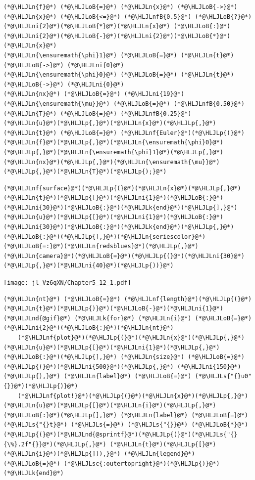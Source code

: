 \documentclass[12pt,a4paper]{article}
\newcommand{\HLJLk}[1]{\textcolor[RGB]{148,91,176}{\textbf{#1}}}
\newcommand{\HLJLn}[1]{#1}
\newcommand{\HLJLnd}[1]{\textcolor[RGB]{214,102,97}{#1}}
\newcommand{\HLJLnf}[1]{\textcolor[RGB]{66,102,213}{#1}}
\newcommand{\HLJLs}[1]{\textcolor[RGB]{201,61,57}{#1}}
\newcommand{\HLJLsc}[1]{\textcolor[RGB]{201,61,57}{#1}}
\newcommand{\HLJLnfB}[1]{\textcolor[RGB]{59,151,46}{#1}}
\newcommand{\HLJLni}[1]{\textcolor[RGB]{59,151,46}{#1}}
\newcommand{\HLJLoB}[1]{\textcolor[RGB]{102,102,102}{\textbf{#1}}}
\newcommand{\HLJLp}[1]{#1}
\begin{document}
\begin{lstlisting}
(*@\HLJLn{f}@*) (*@\HLJLoB{=}@*) (*@\HLJLn{x}@*) (*@\HLJLoB{->}@*) (*@\HLJLn{x}@*) (*@\HLJLoB{<=}@*) (*@\HLJLnfB{0.5}@*) (*@\HLJLoB{?}@*) (*@\HLJLni{2}@*)(*@\HLJLoB{*}@*)(*@\HLJLn{x}@*) (*@\HLJLoB{:}@*) (*@\HLJLni{2}@*)(*@\HLJLoB{-}@*)(*@\HLJLni{2}@*)(*@\HLJLoB{*}@*)(*@\HLJLn{x}@*)
(*@\HLJLn{\ensuremath{\phi}1}@*) (*@\HLJLoB{=}@*) (*@\HLJLn{t}@*) (*@\HLJLoB{->}@*) (*@\HLJLni{0}@*)
(*@\HLJLn{\ensuremath{\phi}0}@*) (*@\HLJLoB{=}@*) (*@\HLJLn{t}@*) (*@\HLJLoB{->}@*) (*@\HLJLni{0}@*)
(*@\HLJLn{nx}@*) (*@\HLJLoB{=}@*) (*@\HLJLni{19}@*)
(*@\HLJLn{\ensuremath{\mu}}@*) (*@\HLJLoB{=}@*) (*@\HLJLnfB{0.50}@*)
(*@\HLJLn{T}@*) (*@\HLJLoB{=}@*) (*@\HLJLnfB{0.25}@*)
(*@\HLJLn{u}@*)(*@\HLJLp{,}@*)(*@\HLJLn{x}@*)(*@\HLJLp{,}@*)(*@\HLJLn{t}@*) (*@\HLJLoB{=}@*) (*@\HLJLnf{Euler}@*)(*@\HLJLp{(}@*)(*@\HLJLn{f}@*)(*@\HLJLp{,}@*)(*@\HLJLn{\ensuremath{\phi}0}@*)(*@\HLJLp{,}@*)(*@\HLJLn{\ensuremath{\phi}1}@*)(*@\HLJLp{,}@*)(*@\HLJLn{nx}@*)(*@\HLJLp{,}@*)(*@\HLJLn{\ensuremath{\mu}}@*)(*@\HLJLp{,}@*)(*@\HLJLn{T}@*)(*@\HLJLp{);}@*)
\end{lstlisting}


\begin{lstlisting}
(*@\HLJLnf{surface}@*)(*@\HLJLp{(}@*)(*@\HLJLn{x}@*)(*@\HLJLp{,}@*)(*@\HLJLn{t}@*)(*@\HLJLp{[}@*)(*@\HLJLni{1}@*)(*@\HLJLoB{:}@*)(*@\HLJLni{30}@*)(*@\HLJLoB{:}@*)(*@\HLJLk{end}@*)(*@\HLJLp{],}@*)(*@\HLJLn{u}@*)(*@\HLJLp{[}@*)(*@\HLJLni{1}@*)(*@\HLJLoB{:}@*)(*@\HLJLni{30}@*)(*@\HLJLoB{:}@*)(*@\HLJLk{end}@*)(*@\HLJLp{,}@*)(*@\HLJLoB{:}@*)(*@\HLJLp{],}@*)(*@\HLJLn{seriescolor}@*)(*@\HLJLoB{=:}@*)(*@\HLJLn{redsblues}@*)(*@\HLJLp{,}@*) (*@\HLJLn{camera}@*)(*@\HLJLoB{=}@*)(*@\HLJLp{(}@*)(*@\HLJLni{30}@*)(*@\HLJLp{,}@*)(*@\HLJLni{40}@*)(*@\HLJLp{))}@*)
\end{lstlisting}

\texttt{[image: jl\_Vz6qXN/Chapter5\_12\_1.pdf]}

\begin{lstlisting}
(*@\HLJLn{nt}@*) (*@\HLJLoB{=}@*) (*@\HLJLnf{length}@*)(*@\HLJLp{(}@*)(*@\HLJLn{t}@*)(*@\HLJLp{)}@*)(*@\HLJLoB{-}@*)(*@\HLJLni{1}@*)
(*@\HLJLnd{@gif}@*) (*@\HLJLk{for}@*) (*@\HLJLn{i}@*) (*@\HLJLoB{=}@*) (*@\HLJLni{2}@*)(*@\HLJLoB{:}@*)(*@\HLJLn{nt}@*) 
    (*@\HLJLnf{plot}@*)(*@\HLJLp{(}@*)(*@\HLJLn{x}@*)(*@\HLJLp{,}@*) (*@\HLJLn{u}@*)(*@\HLJLp{[}@*)(*@\HLJLni{1}@*)(*@\HLJLp{,}@*)(*@\HLJLoB{:}@*)(*@\HLJLp{],}@*) (*@\HLJLn{size}@*) (*@\HLJLoB{=}@*) (*@\HLJLp{(}@*)(*@\HLJLni{500}@*)(*@\HLJLp{,}@*) (*@\HLJLni{150}@*)(*@\HLJLp{),}@*) (*@\HLJLn{label}@*) (*@\HLJLoB{=}@*) (*@\HLJLs{"{}u0"{}}@*)(*@\HLJLp{)}@*)
    (*@\HLJLnf{plot!}@*)(*@\HLJLp{(}@*)(*@\HLJLn{x}@*)(*@\HLJLp{,}@*) (*@\HLJLn{u}@*)(*@\HLJLp{[}@*)(*@\HLJLn{i}@*)(*@\HLJLp{,}@*)(*@\HLJLoB{:}@*)(*@\HLJLp{],}@*) (*@\HLJLn{label}@*) (*@\HLJLoB{=}@*) (*@\HLJLs{"{}t}@*) (*@\HLJLs{=}@*) (*@\HLJLs{"{}}@*) (*@\HLJLoB{*}@*) (*@\HLJLp{(}@*)(*@\HLJLnd{@sprintf}@*)(*@\HLJLp{(}@*)(*@\HLJLs{"{}{\%}.2f"{}}@*)(*@\HLJLp{,}@*) (*@\HLJLn{t}@*)(*@\HLJLp{[}@*)(*@\HLJLn{i}@*)(*@\HLJLp{])),}@*) (*@\HLJLn{legend}@*) (*@\HLJLoB{=}@*) (*@\HLJLsc{:outertopright}@*)(*@\HLJLp{)}@*)
(*@\HLJLk{end}@*)
\end{lstlisting}
\end{document}
